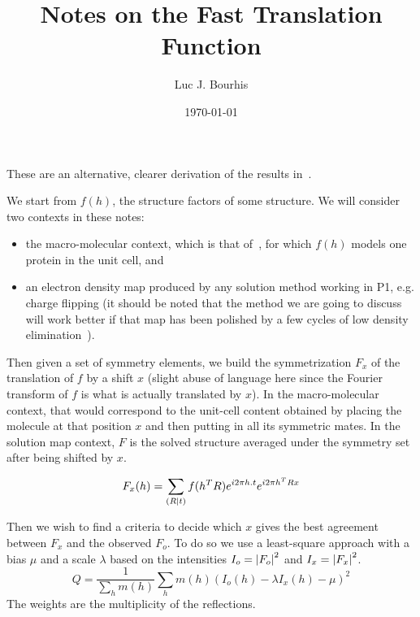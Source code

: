 \documentclass[11pt]{article}
\title{Notes on the Fast Translation Function}
\author{Luc J. Bourhis}
\date{\today}                                           %
\begin{document}
\maketitle

These are an alternative, clearer derivation of the results in~\cite{J.Navaza:1995}.

We start from $f(h)$, the structure factors of some structure. We will consider two contexts in these notes:
\begin{itemize}
\item the macro-molecular context, which is that of~\cite{J.Navaza:1995}, for which $f(h)$ models one protein in the unit cell, and
\item an electron density map produced by any solution method working in P1, e.g. charge flipping (it should be noted that the method we are going to discuss will work better if that map has been polished by a few cycles of low density elimination~\cite{Shiono:1992}).
\end{itemize}

Then given a set of symmetry elements, we build the symmetrization $F_x$ of the translation of $f$ by a shift $x$ (slight abuse of language here since the Fourier transform of $f$ is what is actually translated by $x$). In the macro-molecular context, that would correspond to the unit-cell content obtained by placing the molecule at that position $x$ and then putting in all its symmetric mates. In the solution map context, $F$ is the solved structure averaged under the symmetry set after being shifted by $x$.

\begin{equation}
F_x(h) = \sum_{\left( R \mid t \right)} f(h^T R) e^{i2\pi h.t} e^{i2\pi h^T R x}
\end{equation}

Then we wish to find a criteria to decide which $x$ gives the best agreement between $F_x$ and the observed $F_o$. To do so we use a least-square approach with a bias $\mu$ and a scale $\lambda$ based on the intensities $I_o = \left| F_o \right|^2$ and $I_x = \left| F_x \right|^2$.
\begin{equation}
Q = \frac{1}{\sum_h m(h)} \sum_h m(h) \left(I_o(h) - \lambda I_x(h) - \mu\right)^2
\end{equation}
The weights are the multiplicity of the reflections.
\end{document}
